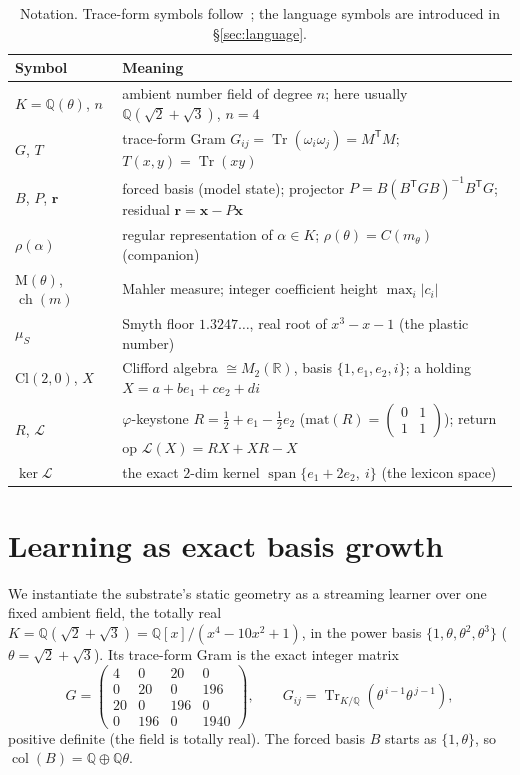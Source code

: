 \documentclass[11pt]{article}
\theoremstyle{plain}
\theoremstyle{definition}
\theoremstyle{remark}
\newcommand{\Q}{\mathbb{Q}}
\newcommand{\R}{\mathbb{R}}
\newcommand{\K}{K}
\newcommand{\Tr}{\operatorname{Tr}}
\newcommand{\Mah}{\mathrm{M}}
\newcommand{\rr}{\mathbf{r}}
\newcommand{\xx}{\mathbf{x}}
\newcommand{\GG}{G}
\newcommand{\BB}{B}
\newcommand{\transpose}{^{\mathsf{T}}}
\newcommand{\inv}{^{-1}}
\newcommand{\Cl}{\mathrm{Cl}}
\newcommand{\Lop}{\mathcal{L}}
\DeclareMathOperator{\col}{col}
\DeclareMathOperator{\ch}{ch}
\DeclareMathOperator{\spn}{span}
\begin{document}
\begin{table}[ht]
\centering
\small
\begin{tabular}{ll}
\toprule
Symbol & Meaning \\
\midrule
$\K=\Q(\theta)$, $n$ & ambient number field of degree $n$; here usually $\Q(\sqrt2+\sqrt3)$, $n=4$ \\
$\GG$, $T$ & trace-form Gram $\GG_{ij}=\Tr(\omega_i\omega_j)=M\transpose M$; $T(x,y)=\Tr(xy)$ \\
$\BB$, $P$, $\rr$ & forced basis (model state); projector $P=\BB(\BB\transpose\GG\BB)\inv\BB\transpose\GG$; residual $\rr=\xx-P\xx$ \\
$\rho(\alpha)$ & regular representation of $\alpha\in\K$; $\rho(\theta)=C(m_\theta)$ (companion) \\
$\Mah(\theta)$, $\ch(m)$ & Mahler measure; integer coefficient height $\max_i|c_i|$ \\
$\mu_S$ & Smyth floor $1.3247\ldots$, real root of $x^3-x-1$ (the plastic number) \\
$\Cl(2,0)$, $X$ & Clifford algebra $\cong M_2(\R)$, basis $\{1,e_1,e_2,i\}$; a holding $X=a+be_1+ce_2+di$ \\
$R$, $\Lop$ & $\varphi$-keystone $R=\tfrac12+e_1-\tfrac12 e_2$ ($\mathrm{mat}(R)=(\begin{smallmatrix}0&1\\1&1\end{smallmatrix})$); return op $\Lop(X)=RX+XR-X$ \\
$\ker\Lop$ & the exact $2$-dim kernel $\spn\{e_1+2e_2,\ i\}$ (the lexicon space) \\
\bottomrule
\end{tabular}
\caption{Notation. Trace-form symbols follow~\cite{VectorSubstrate}; the language symbols are introduced in
\S\ref{sec:language}.}
\label{tab:notation}
\end{table}

\section{Learning as exact basis growth}\label{sec:learning}

We instantiate the substrate's static geometry as a streaming learner over one fixed ambient field, the
totally real $\K=\Q(\sqrt2+\sqrt3)=\Q[x]/(x^4-10x^2+1)$, in the power basis $\{1,\theta,\theta^2,\theta^3\}$
($\theta=\sqrt2+\sqrt3$). Its trace-form Gram is the exact integer matrix
\begin{equation}\label{eq:Gpower}
  \GG=\begin{pmatrix}4&0&20&0\\0&20&0&196\\20&0&196&0\\0&196&0&1940\end{pmatrix},
  \qquad \GG_{ij}=\Tr_{\K/\Q}(\theta^{\,i-1}\theta^{\,j-1}),
\end{equation}
positive definite (the field is totally real). The forced basis $\BB$ starts as $\{1,\theta\}$, so
$\col(\BB)=\Q\oplus\Q\theta$.
\end{document}
